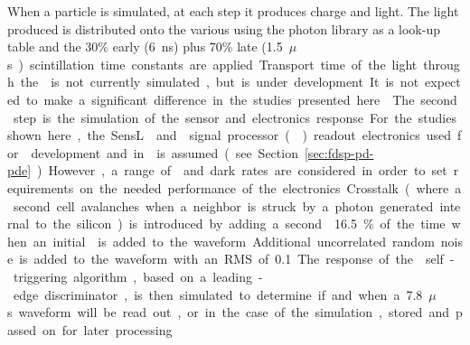 When a particle is simulated, at each step it produces charge and light. The light produced is distributed onto the various  using the photon library as a look-up table and the 30\% early (\SI{6}{ns}) plus 70\% late (\SI{1.5}{$\mu$s}) scintillation time constants are applied. Transport time of the light through the \lar is not currently simulated, but is under development. It is not expected to make a significant difference in the studies presented here.


The second step is the simulation of the sensor and electronics response. For the studies shown here, the SensL  and  signal processor () readout electronics used for  development and in  is assumed (see Section~\ref{sec:fdsp-pd-pde}). However, a range of  and dark rates are considered in order to set requirements on the needed performance of the electronics.
Crosstalk (where a second cell avalanches when a neighbor is struck by a photon generated internal to the silicon) is introduced by adding a second \phel \num{16.5}\% of the time when an initial \phel is added to the waveform. Additional uncorrelated random noise is added to the waveform with an RMS of %
\SI{0.1}{\phel{}}. The response of the  self-triggering algorithm, based on a leading-edge discriminator, is then simulated to determine if and when a \SI{7.8}{$\mu$s} waveform will be read out, or in the case of the simulation, 
stored and passed on for later processing.



